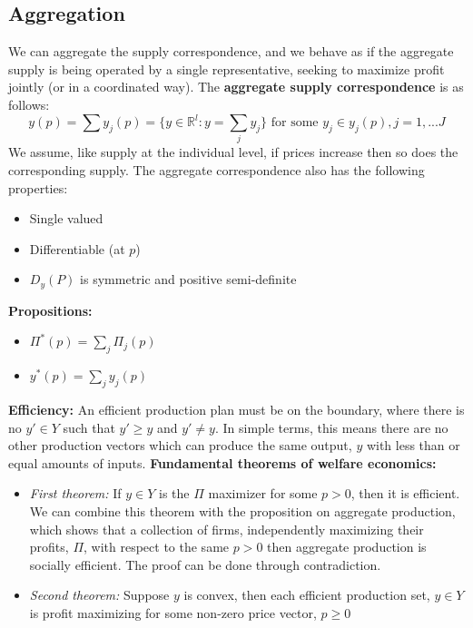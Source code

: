\documentclass{article}
\begin{document}
\subsection{Aggregation}
We can aggregate the supply correspondence, and we behave as if the aggregate supply is being operated by a single representative, seeking to maximize profit jointly (or in a coordinated way). The \textbf{aggregate supply correspondence} is as follows:
\[
y(p) = \sum y_{j}(p) = \{ y \in \mathbb{R}^l: y = \sum_{j}y_j \} \text{ for some } y_j \in y_{j}(p), j = 1,...J
\]
We assume, like supply at the individual level, if prices increase then so does the corresponding supply. The aggregate correspondence also has the following properties: 
\begin{itemize}
    \item Single valued
    \item Differentiable (at $p$)
    \item $D_{y}(P)$ is symmetric and positive semi-definite
\end{itemize}
\textbf{Propositions:}
\begin{itemize}
    \item $\Pi^*(p) = \sum_{j} \Pi_{j}(p)$
    \item $y^*(p) = \sum_{j} y_{j}(p)$
\end{itemize} 
\textbf{Efficiency:} An efficient production plan must be on the boundary, where there is no $y' \in Y$ such that $y' \geq y$ and $y' \neq y$. In simple terms, this means there are no other production vectors which can produce the same output, $y$ with less than or equal amounts of inputs. 
\newpage
\textbf{Fundamental theorems of welfare economics:}
\begin{itemize}
    \item \textit{First theorem:} If $y \in Y$ is the $\Pi$ maximizer for some $p > 0$, then it is efficient. We can combine this theorem with the proposition on aggregate production, which shows that a collection of firms, independently maximizing their profits, $\Pi$, with respect to the same $p > 0$ then aggregate production is socially efficient. The proof can be done through contradiction. 
    \item \textit{Second theorem:} Suppose $y$ is convex, then each efficient production set, $y \in Y$ is profit maximizing for some non-zero price vector, $p \geq 0$
\end{itemize}
\end{document}
